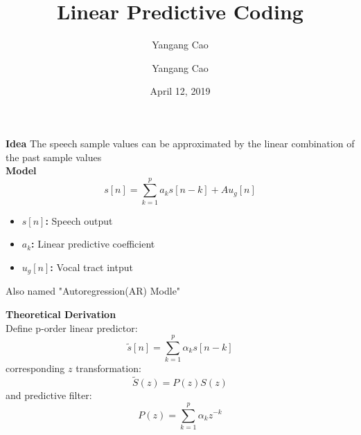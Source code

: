 \documentclass[10pt,a4paper,oneside]{beamer}
\author{Yangang Cao}
\author{Yangang Cao}
\title{Linear Predictive Coding}
\date{April 12, 2019}
\begin{document}
	
\frame[plain]{\titlepage}

\begin{frame}
\vspace{0.5cm}
{\bfseries Idea}
The speech sample values can be approximated by the linear combination of the past sample values\\
\vspace{0.5cm}
{\bfseries Model}
\[
s[n] = \sum_{k=1}^{p}a_ks[n-k] + Au_g[n]
\]
\begin{itemize}
\item {\bfseries $s[n]$:} Speech output
\item {\bfseries $a_k$:} Linear predictive coefficient
\item {\bfseries $u_g[n]$:} Vocal tract intput
\end{itemize}
\vspace{0.5cm}
Also named "Autoregression(AR) Modle"

\end{frame}

\begin{frame}
\vspace{0.5cm}
{\bfseries Theoretical Derivation}
\vspace{0.1cm}\\
Define p-order linear predictor:
\[
\widetilde s[n] = \sum_{k=1}^{p}\alpha_ks[n-k]
\]
corresponding $z$ transformation:
\[
 \widetilde S(z) = P(z)S(z)
\]
and predictive filter:
\[
P(z) = \sum_{k=1}^{p}\alpha_kz^{-k}
\]
\end{frame}
\end{document}
